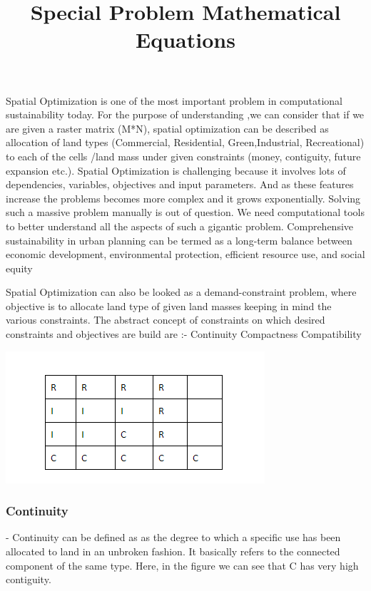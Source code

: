 \documentclass[twoside,10pt]{article}
\begin{document}
\title{Special Problem Mathematical Equations}
\author{}
\date{}
\maketitle


Spatial Optimization is one of the most important problem in computational sustainability today. For the purpose of understanding ,we can consider that if we are given a raster matrix (M*N), spatial optimization can be described as allocation of land types (Commercial, Residential, Green,Industrial, Recreational) to each of the cells /land mass under given constraints (money, contiguity, future expansion etc.).  Spatial Optimization is challenging because it involves lots of dependencies, variables, objectives and input parameters. And as these features increase the problems becomes more complex and it grows exponentially. Solving such a massive problem manually is out of question. We need computational tools to better understand all the aspects of such a gigantic problem.
Comprehensive sustainability in urban planning can be termed as a long-term balance between economic development, environmental protection, efficient resource use, and social equity


Spatial Optimization can also be looked as a demand-constraint problem, where objective is to allocate land type of given land masses keeping in mind the various constraints. The abstract concept of constraints on which  desired constraints and objectives are build are :-
Continuity
Compactness
Compatibility

\graphicspath{ {images/} }
\includegraphics{raster}

\subsubsection*{Continuity} - Continuity can be defined as as the degree to which a specific use has been allocated to land in an unbroken fashion. It basically refers to the connected component of the same type. Here, in the figure we can see that C has very high contiguity.
\end{document}
